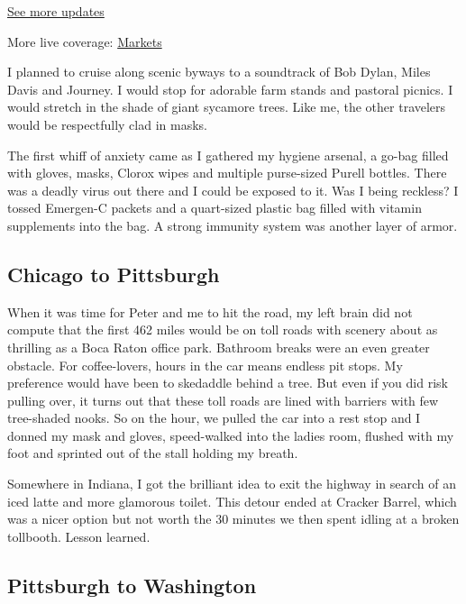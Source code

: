 \href{https://www.nytimes3xbfgragh.onion/2020/09/08/world/covid-19-coronavirus.html?action=click\&pgtype=Article\&state=default\&region=MAIN_CONTENT_1\&context=storylines_live_updates}{See
more updates}

More live coverage:
\href{https://www.nytimes3xbfgragh.onion/live/2020/09/08/business/stock-market-today-coronavirus?action=click\&pgtype=Article\&state=default\&region=MAIN_CONTENT_1\&context=storylines_live_updates}{Markets}

I planned to cruise along scenic byways to a soundtrack of Bob Dylan,
Miles Davis and Journey. I would stop for adorable farm stands and
pastoral picnics. I would stretch in the shade of giant sycamore trees.
Like me, the other travelers would be respectfully clad in masks.

The first whiff of anxiety came as I gathered my hygiene arsenal, a
go-bag filled with gloves, masks, Clorox wipes and multiple purse-sized
Purell bottles. There was a deadly virus out there and I could be
exposed to it. Was I being reckless? I tossed Emergen-C packets and a
quart-sized plastic bag filled with vitamin supplements into the bag. A
strong immunity system was another layer of armor.

\hypertarget{chicago-to-pittsburgh}{%
\subsection{Chicago to Pittsburgh}\label{chicago-to-pittsburgh}}

When it was time for Peter and me to hit the road, my left brain did not
compute that the first 462 miles would be on toll roads with scenery
about as thrilling as a Boca Raton office park. Bathroom breaks were an
even greater obstacle. For coffee-lovers, hours in the car means endless
pit stops. My preference would have been to skedaddle behind a tree. But
even if you did risk pulling over, it turns out that these toll roads
are lined with barriers with few tree-shaded nooks. So on the hour, we
pulled the car into a rest stop and I donned my mask and gloves,
speed-walked into the ladies room, flushed with my foot and sprinted out
of the stall holding my breath.

Somewhere in Indiana, I got the brilliant idea to exit the highway in
search of an iced latte and more glamorous toilet. This detour ended at
Cracker Barrel, which was a nicer option but not worth the 30 minutes we
then spent idling at a broken tollbooth. Lesson learned.

\hypertarget{pittsburgh-to-washington}{%
\subsection{Pittsburgh to Washington}\label{pittsburgh-to-washington}}

